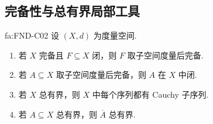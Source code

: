 \subsection{完备性与总有界局部工具}

\begin{FAProposition}[C][完备性与紧性局部工具]{fa:FND-C02}
设 \(\displaystyle (X,d)\) 为度量空间.
\begin{enumerate}[label=\textup{(\roman*)}]
\item 若 \(\displaystyle X\) 完备且 \(\displaystyle F\subseteq X\) 闭，则 \(\displaystyle F\) 取子空间度量后完备.
\item 若 \(\displaystyle A\subseteq X\) 取子空间度量后完备，则 \(\displaystyle A\) 在 \(\displaystyle X\) 中闭.
\item 若 \(\displaystyle X\) 总有界，则 \(\displaystyle X\) 中每个序列都有 Cauchy 子序列.
\item 若 \(\displaystyle A\subseteq X\) 总有界，则 \(\displaystyle \overline A\) 总有界.
\end{enumerate}
\end{FAProposition}

